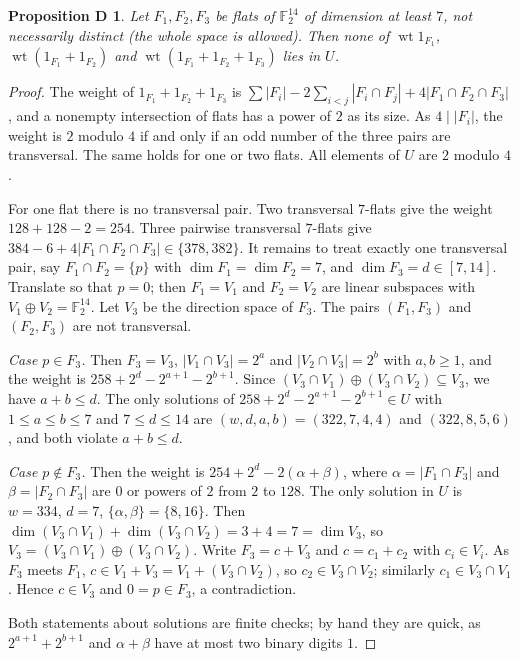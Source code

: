 \documentclass[11pt]{article}
\newtheorem*{propD}{Proposition D}
\theoremstyle{remark}
\newcommand{\F}{\mathbb F}
\DeclareMathOperator{\wt}{wt}
\begin{document}
\begin{propD}
Let $F_1,F_2,F_3$ be flats of $\F_2^{14}$ of dimension at least $7$, not
necessarily distinct (the whole space is allowed). Then none of $\wt 1_{F_1}$,
$\wt(1_{F_1}+1_{F_2})$ and $\wt(1_{F_1}+1_{F_2}+1_{F_3})$ lies in $U$.
\end{propD}
\begin{proof}
The weight of $1_{F_1}+1_{F_2}+1_{F_3}$ is
$\sum|F_i|-2\sum_{i<j}|F_i\cap F_j|+4|F_1\cap F_2\cap F_3|$, and a nonempty
intersection of flats has a power of $2$ as its size. As $4\mid|F_i|$, the
weight is $2$ modulo $4$ if and only if an odd number of the three pairs are
transversal. The same holds for one or two flats. All elements of $U$ are $2$
modulo $4$.

For one flat there is no transversal pair. Two transversal $7$-flats give the
weight $128+128-2=254$. Three pairwise transversal $7$-flats give
$384-6+4|F_1\cap F_2\cap F_3|\in\{378,382\}$. It remains to treat exactly one
transversal pair, say $F_1\cap F_2=\{p\}$ with $\dim F_1=\dim F_2=7$, and
$\dim F_3=d\in[7,14]$. Translate so that $p=0$; then $F_1=V_1$ and $F_2=V_2$
are linear subspaces with $V_1\oplus V_2=\F_2^{14}$. Let $V_3$ be the direction
space of $F_3$. The pairs $(F_1,F_3)$ and $(F_2,F_3)$ are not transversal.

\emph{Case $p\in F_3$.} Then $F_3=V_3$, $|V_1\cap V_3|=2^a$ and
$|V_2\cap V_3|=2^b$ with $a,b\ge1$, and the weight is
$258+2^d-2^{a+1}-2^{b+1}$. Since $(V_3\cap V_1)\oplus(V_3\cap V_2)\subseteq V_3$,
we have $a+b\le d$. The only solutions of $258+2^d-2^{a+1}-2^{b+1}\in U$ with
$1\le a\le b\le7$ and $7\le d\le14$ are $(w,d,a,b)=(322,7,4,4)$ and
$(322,8,5,6)$, and both violate $a+b\le d$.

\emph{Case $p\notin F_3$.} Then the weight is $254+2^d-2(\alpha+\beta)$, where
$\alpha=|F_1\cap F_3|$ and $\beta=|F_2\cap F_3|$ are $0$ or powers of $2$ from
$2$ to $128$. The
only solution in $U$ is $w=334$, $d=7$, $\{\alpha,\beta\}=\{8,16\}$. Then
$\dim(V_3\cap V_1)+\dim(V_3\cap V_2)=3+4=7=\dim V_3$, so
$V_3=(V_3\cap V_1)\oplus(V_3\cap V_2)$. Write $F_3=c+V_3$ and $c=c_1+c_2$ with
$c_i\in V_i$. As $F_3$ meets $F_1$, $c\in V_1+V_3=V_1+(V_3\cap V_2)$, so
$c_2\in V_3\cap V_2$; similarly $c_1\in V_3\cap V_1$. Hence $c\in V_3$ and
$0=p\in F_3$, a contradiction.

Both statements about solutions are finite checks; by hand they are quick, as
$2^{a+1}+2^{b+1}$ and $\alpha+\beta$ have at most two binary digits $1$.
\end{proof}
\end{document}

